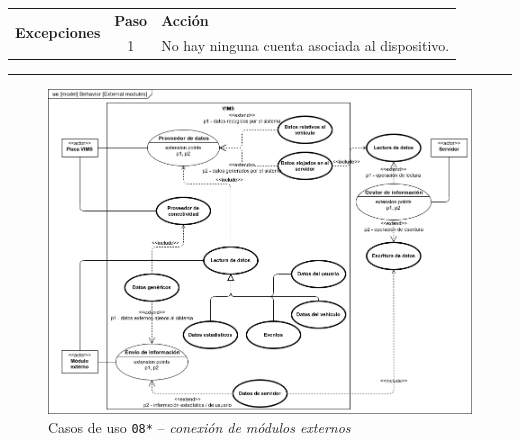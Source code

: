 \begin{table}[H]
\begin{tabularx}{\textwidth}{|c|c|X|}
    \hline
    \multirow{2}{*}{\textbf{Excepciones}}      & \textbf{Paso}                                                                                                                       & \textbf{Acción}                                                                                                                         \\
    \cline{2-3}
                                               & 1                                                                                                                                   & \multicolumn{1}{L|}{No hay ninguna cuenta asociada al dispositivo.}                                                                     \\
    \hline
  \end{tabularx}
\end{table}

\noindent\rule{\linewidth}{.2pt}

\begin{figure}[H]
  \centering
  \includegraphics[width=\linewidth]{diagrams/UseCases-UC8 - external modules.png}
  \caption{Casos de uso \texttt{08*} -- \textit{conexión de módulos externos}}
  \label{uc:external-modules}
\end{figure}

